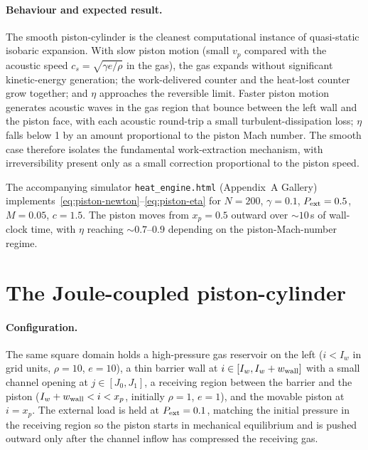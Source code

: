 \paragraph{Behaviour and expected result.}
The smooth piston-cylinder is the cleanest computational instance of
quasi-static isobaric expansion. With slow piston motion (small $v_p$
compared with the acoustic speed $c_s = \sqrt{\gamma e/\rho}$ in the
gas), the gas expands without significant kinetic-energy generation;
the work-delivered counter and the heat-lost counter grow together;
and $\eta$ approaches the reversible limit. Faster piston motion
generates acoustic waves in the gas region that bounce between the
left wall and the piston face, with each acoustic round-trip a small
turbulent-dissipation loss; $\eta$ falls below 1 by an amount
proportional to the piston Mach number. The smooth case therefore
isolates the fundamental work-extraction mechanism, with irreversibility
present only as a small correction proportional to the piston speed.

The accompanying simulator \texttt{heat\_engine.html} (Appendix~A
Gallery) implements~\eqref{eq:piston-newton}--\eqref{eq:piston-eta} for
$N = 200$, $\gamma = 0.1$, $P_{\rm ext} = 0.5$, $M = 0.05$,
$c = 1.5$. The piston moves from $x_p = 0.5$ outward over $\sim 10\,$s
of wall-clock time, with $\eta$ reaching $\sim 0.7$--$0.9$ depending on
the piston-Mach-number regime.

\section{The Joule-coupled piston-cylinder}\label{sec:piston-joule}

\paragraph{Configuration.}
The same square domain holds a high-pressure gas reservoir on the left
($i < I_w$ in grid units, $\rho = 10$, $e = 10$), a thin barrier wall at
$i \in [I_w, I_w + w_{\rm wall}]$ with a small channel opening at
$j \in [J_0, J_1]$, a receiving region between the barrier and the
piston ($I_w + w_{\rm wall} < i < x_p$, initially $\rho = 1$, $e = 1$),
and the movable piston at $i = x_p$. The external load is held at
$P_{\rm ext} = 0.1$, matching the initial pressure in the receiving
region so the piston starts in mechanical equilibrium and is pushed
outward only after the channel inflow has compressed the receiving
gas.

